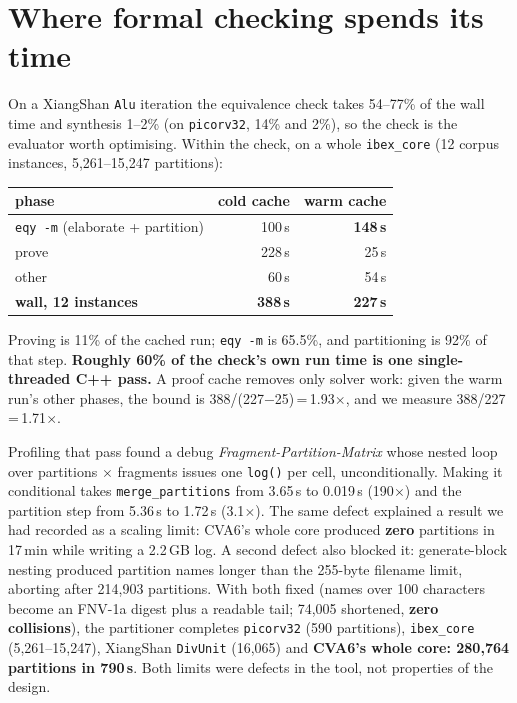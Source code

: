 \documentclass[sigconf,nonacm]{acmart}
\begin{document}
\section{Where formal checking spends its time}
\label{sec:cost}

On a XiangShan \texttt{Alu} iteration the equivalence check takes 54--77\% of
the wall time and synthesis 1--2\% (on \texttt{picorv32}, 14\% and 2\%), so the
check is the evaluator worth optimising. Within the check, on a whole
\texttt{ibex\_core} (12 corpus instances, 5{,}261--15{,}247 partitions):

\begin{center}\small
\begin{tabular}{@{}lrr@{}}
\toprule
phase & cold cache & warm cache \\
\midrule
\texttt{eqy -m} (elaborate + partition) & 100\,s & \textbf{148\,s} \\
prove & 228\,s & 25\,s \\
other & 60\,s & 54\,s \\
\midrule
\textbf{wall, 12 instances} & \textbf{388\,s} & \textbf{227\,s} \\
\bottomrule
\end{tabular}
\end{center}

Proving is 11\% of the cached run; \texttt{eqy -m} is 65.5\%, and partitioning
is 92\% of that step. \textbf{Roughly 60\% of the check's own run time is one
single-threaded C++ pass.} A proof cache removes only solver work: given the
warm run's other phases, the bound is 388/(227$-$25)\,=\,1.93$\times$, and we
measure 388/227\,=\,1.71$\times$.

Profiling that pass found a debug \emph{Fragment-Partition-Matrix} whose nested
loop over partitions $\times$ fragments issues one \texttt{log()} per cell,
unconditionally. Making it conditional takes \texttt{merge\_partitions} from
3.65\,s to 0.019\,s (190$\times$) and the partition step from 5.36\,s to
1.72\,s (3.1$\times$). The same defect explained a result we had recorded as a
scaling limit: CVA6's whole core produced \textbf{zero} partitions in 17\,min
while writing a 2.2\,GB log. A second defect also blocked it: generate-block
nesting produced partition names longer than the 255-byte filename limit,
aborting after 214{,}903 partitions. With both fixed (names over 100 characters
become an FNV-1a digest plus a readable tail; 74{,}005 shortened,
\textbf{zero collisions}), the partitioner completes \texttt{picorv32} (590
partitions), \texttt{ibex\_core} (5{,}261--15{,}247), XiangShan
\texttt{DivUnit} (16{,}065) and \textbf{CVA6's whole core: 280{,}764 partitions
in 790\,s}. Both limits were defects in the tool, not properties of the design.
\end{document}
